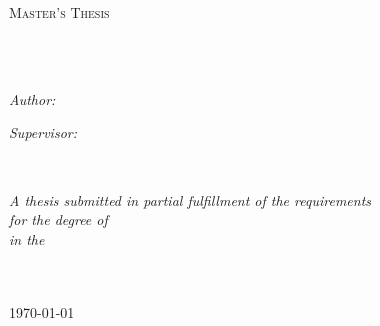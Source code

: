 \documentclass[
11pt, %
english, %
singlespacing, %
headsepline, %
tikz,
oneside,
]{MastersDoctoralThesis} %
\author{\textsc{Jinank} \textsc{Jain}} %
\begin{document}
\frontmatter %

\pagestyle{plain} %


\begin{titlepage}
\begin{center}

\vspace*{.06\textheight}
{\scshape\LARGE \univname\par}\vspace{1.5cm} %
\textsc{\Large Master's Thesis}\\[0.5cm] %

\HRule \\[0.4cm] %
{\huge \bfseries \ttitle\par}\vspace{0.4cm} %
\HRule \\[1.5cm] %
 
\begin{minipage}[t]{0.4\textwidth}
\begin{flushleft} \large
\emph{Author:}\\
\href{http://www.jinankjain.com}{\authorname} %
\end{flushleft}
\end{minipage}
\begin{minipage}[t]{0.4\textwidth}
\begin{flushright} \large
\emph{Supervisor:} \\
\href{http://www.netsec.ethz.ch/people/aperrig/}{\supname} %
\end{flushright}
\end{minipage}\\[3cm]
 
\vfill

\large \textit{A thesis submitted in partial fulfillment of the requirements\\ for the degree of \degreename}\\[0.3cm] %
\textit{in the}\\[0.4cm]
\groupname\\\deptname\\[2cm] %
 
\vfill

{\large \today}\\[4cm] %
 
\vfill
\end{center}
\end{titlepage}
\end{document}
